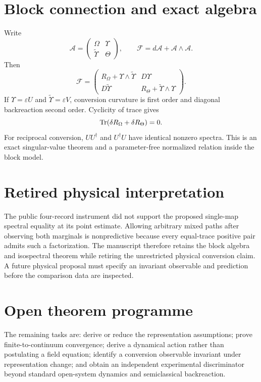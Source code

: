 \documentclass[11pt,a4paper]{article}
\begin{document}
\section{Block connection and exact algebra}
Write
\begin{equation}
\mathcal A=\begin{pmatrix}\Omega&\Upsilon\\\widetilde\Upsilon&\Theta\end{pmatrix},
\qquad
\mathcal F=d\mathcal A+\mathcal A\wedge\mathcal A.
\end{equation}
Then
\begin{equation}
\mathcal F=\begin{pmatrix}
R_\Omega+\Upsilon\wedge\widetilde\Upsilon&D\Upsilon\\
D\widetilde\Upsilon&R_\Theta+\widetilde\Upsilon\wedge\Upsilon
\end{pmatrix}.
\end{equation}
If $\Upsilon=\varepsilon U$ and $\widetilde\Upsilon=\varepsilon V$, conversion curvature is first order and diagonal backreaction second order. Cyclicity of trace gives
\begin{equation}
\operatorname{Tr}(\delta R_\Omega+\delta R_\Theta)=0.
\end{equation}
For reciprocal conversion, $UU^\dagger$ and $U^\dagger U$ have identical nonzero spectra. This is an exact singular-value theorem and a parameter-free normalized relation inside the block model.

\section{Retired physical interpretation}
The public four-record instrument did not support the proposed single-map spectral equality at its point estimate. Allowing arbitrary mixed paths after observing both marginals is nonpredictive because every equal-trace positive pair admits such a factorization. The manuscript therefore retains the block algebra and isospectral theorem while retiring the unrestricted physical conversion claim. A future physical proposal must specify an invariant observable and prediction before the comparison data are inspected.

\section{Open theorem programme}
The remaining tasks are: derive or reduce the representation assumptions; prove finite-to-continuum convergence; derive a dynamical action rather than postulating a field equation; identify a conversion observable invariant under representation change; and obtain an independent experimental discriminator beyond standard open-system dynamics and semiclassical backreaction.
\end{document}
